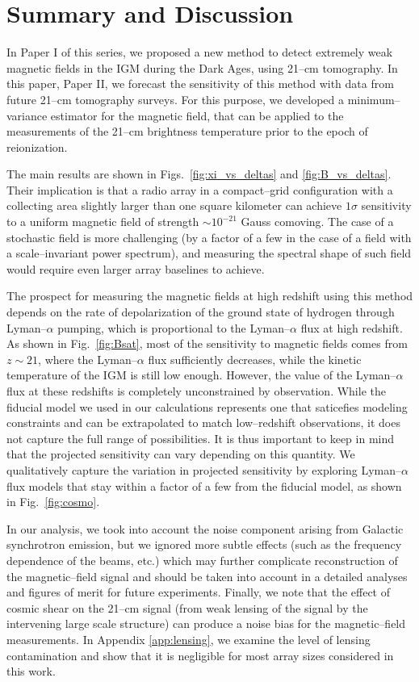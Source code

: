 \section{Summary and Discussion}
\label{sec:conclusions}

In Paper I of this series, we proposed a new method to detect extremely weak magnetic fields in the IGM during the Dark Ages, using 21--cm tomography. In this paper, Paper II, we forecast the sensitivity of this method with data from future 21--cm tomography surveys. For this purpose, we developed a minimum--variance estimator for the magnetic field, that can be applied to the measurements of the 21--cm brightness temperature prior to the epoch of reionization. 

The main results are shown in Figs.~\ref{fig:xi_vs_deltas} and \ref{fig:B_vs_deltas}. Their implication is that a radio array in a compact--grid configuration with a collecting area slightly larger than one square kilometer can achieve $1\sigma$ sensitivity to a uniform magnetic field of strength $\sim10^{-21}$ Gauss comoving. The case of a stochastic field is more challenging (by a factor of a few in the case of a field with a scale--invariant power spectrum), and measuring the spectral shape of such field would require even larger array baselines to achieve.

The prospect for measuring the magnetic fields at high redshift using this method depends on the rate of depolarization of the ground state of hydrogen through Lyman--$\alpha$ pumping, which is proportional to the Lyman--$\alpha$ flux at high redshift. As shown in Fig.~\ref{fig:Bsat}, most of the sensitivity to magnetic fields comes from $z\sim 21$, where the Lyman--$\alpha$ flux sufficiently decreases, while the kinetic temperature of the IGM is still low enough. However, the value of the Lyman--$\alpha$ flux at these redshifts is completely unconstrained by observation. While the fiducial model we used in our calculations represents one that saticefies modeling constraints and can be extrapolated to match low--redshift observations, it does not capture the full range of possibilities. It is thus important to keep in mind that the projected sensitivity can vary depending on this quantity. We qualitatively capture the variation in projected sensitivity by exploring Lyman--$\alpha$ flux models that stay within a factor of a few from the fiducial model, as shown in Fig.~\ref{fig:cosmo}.

In our analysis, we took into account the noise component arising from Galactic synchrotron emission, but we ignored more subtle effects (such as the frequency dependence of the beams, etc.) which may further complicate reconstruction of the magnetic--field signal and should be taken into account in a detailed analyses and figures of merit for future experiments.
Finally, we note that the effect of cosmic shear on the 21--cm signal (from weak lensing of the signal by the intervening large scale structure) can produce a noise bias for the magnetic--field measurements. In Appendix \ref{app:lensing}, we examine the level of lensing contamination and show that it is negligible for most array sizes considered in this work. 

